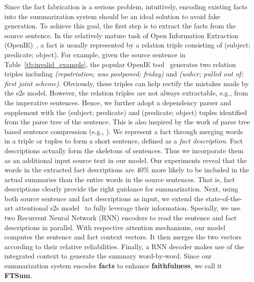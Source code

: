 \documentclass[letterpaper]{article} %
\begin{document}
	Since the fact fabrication is a serious problem, intuitively, encoding existing facts into the summarization system should be an ideal solution to avoid fake generation.
	To achieve this goal, the first step is to extract the facts from the source sentence.
	In the relatively mature task of Open Information Extraction (OpenIE)~\cite{banko2007open}, a fact is usually represented by a relation triple consisting of (subject; predicate; object).
	For example, given the source sentence in Table~\ref{tb:invalid_example}, the popular OpenIE tool~\cite{angeli2015leveraging} generates two relation triples including \textit{(repatriation; was postponed; friday)} and \textit{(unhcr; pulled out of; first joint scheme)}.
	Obviously, these triples can help rectify the mistakes made by the s2s model.
	However, the relation triples are not always extractable, e.g., from the imperative sentences.
Hence, we further adopt a dependency parser and supplement with the (subject; predicate) and (predicate; object) tuples identified from the parse tree of the sentence.  
This is also inspired by the work of parse tree based sentence compression (e.g., \cite{knight2002summarization}).
We represent a fact through merging words in a triple or tuples to form a short sentence, defined as a \textit{fact description}.
	Fact descriptions actually form the skeletons of sentences.
	Thus we incorporate them as an additional input source text in our model.
	Our experiments reveal that the words in the extracted fact descriptions are 40\% more likely to be included in the actual summaries than the entire words in the source sentences.
	That is, fact descriptions clearly provide the right guidance for summarization.
	Next, using both source sentence and fact descriptions as input, we extend the state-of-the-art attentional s2s model~\cite{nallapati2016abstractive} to fully leverage their information.
	Specially, we use two Recurrent Neural Network (RNN) encoders to read the sentence and fact descriptions in parallel.
	With respective attention mechanisms, our model computes the sentence and fact context vectors.
	It then merges the two vectors according to their relative reliabilities.
	Finally, a RNN decoder makes use of the integrated context to generate the summary word-by-word.
	Since our summarization system encodes \textbf{facts} to enhance \textbf{faithfulness}, we call it \textbf{FTSum}.
	
\end{document}
